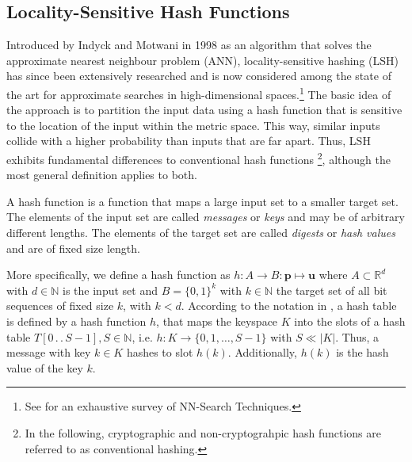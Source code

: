 \subsection{Locality-Sensitive Hash Functions} \label{subsec:locality-sensitive-hashes}

Introduced by Indyck and Motwani in 1998 \cite{indyk_approximate_1998} as an algorithm that solves the approximate nearest neighbour problem (ANN), locality-sensitive hashing (LSH) has since been extensively researched and is now considered among the state of the art for approximate searches in high-dimensional spaces.\footnote{See \cite{nagarkar2021exploring} for an exhaustive survey of NN-Search Techniques.} The basic idea of the approach is to partition the input data using a hash function that is sensitive to the location of the input within the metric space. This way, similar inputs collide with a higher probability than inputs that are far apart. Thus, LSH exhibits fundamental differences to conventional hash functions \footnote{In the following, cryptographic and non-cryptograhpic hash functions are referred to as conventional hashing.}, although the most general definition applies to both.

A hash function is a function that maps a large input set to a smaller target set. The elements of the input set are called \textit{messages} or \textit{keys} and may be of arbitrary different lengths. The elements of the target set are called \textit{digests} or \textit{hash values} and are of fixed size length.

More specifically, we define a hash function as $h: A \rightarrow B : \bm{p} \mapsto \bm{u}$ where $A \subset \mathbb{R}^d$ with $d \in \mathbb{N}$ is the input set and $B=\{0, 1\}^k$ with $k \in \mathbb{N}$ the target set of all bit sequences of fixed size $k$, with $k < d$. According to the notation in \cite[256]{cormen2022introduction}, a hash table is defined by a hash function $h$, that maps the keyspace $K$ into the slots of a hash table $T[0 \,.\,.\, S-1], S \in \mathbb{N}$, i.e. $h: K \rightarrow \{0, 1, \dots, S-1\}$ with $S \ll |K|$. Thus, a message with key $k \in K$ hashes to slot $h(k)$. Additionally, $h(k)$ is the hash value of the key $k$.




